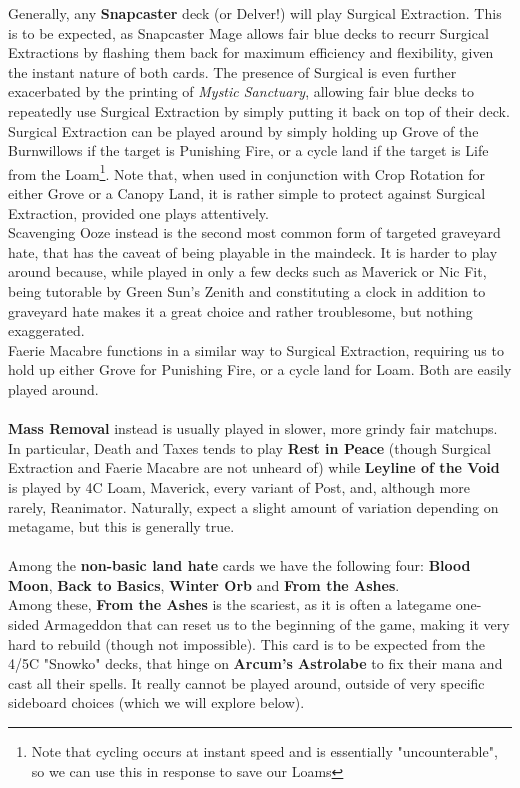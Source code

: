 \documentclass{report}
\begin{document}
Generally, any \textbf{Snapcaster} deck (or Delver!) will play Surgical Extraction. This is to be expected, as Snapcaster Mage allows fair blue decks to recurr Surgical Extractions by flashing them back for maximum efficiency and flexibility, given the instant nature of both cards. The presence of Surgical is even further exacerbated by the printing of \emph{Mystic Sanctuary}, allowing fair blue decks to repeatedly use Surgical Extraction by simply putting it back on top of their deck.\\
Surgical Extraction can be played around by simply holding up Grove of the Burnwillows if the target is Punishing Fire, or a cycle land if the target is Life from the Loam\footnote{Note that cycling occurs at instant speed and is essentially "uncounterable", so we can use this in response to save our Loams}. Note that, when used in conjunction with Crop Rotation for either Grove or a Canopy Land, it is rather simple to protect against Surgical Extraction, provided one plays attentively.\\
Scavenging Ooze instead is the second most common form of targeted graveyard hate, that has the caveat of being playable in the maindeck. It is harder to play around because, while played in only a few decks such as Maverick or Nic Fit, being tutorable by Green Sun's Zenith and constituting a clock in addition to graveyard hate makes it a great choice and rather troublesome, but nothing exaggerated.\\
Faerie Macabre functions in a similar way to Surgical Extraction, requiring us to hold up either Grove for Punishing Fire, or a cycle land for Loam. Both are easily played around.\\\\
\newpage
\textbf{Mass Removal} instead is usually played in slower, more grindy fair matchups. In particular, Death and Taxes tends to play \textbf{Rest in Peace} (though Surgical Extraction and Faerie Macabre are not unheard of) while \textbf{Leyline of the Void} is played by 4C Loam, Maverick, every variant of Post, and, although more rarely, Reanimator. Naturally, expect a slight amount of variation depending on metagame, but this is generally true.\\\\
Among the \textbf{non-basic land hate} cards we have the following four: \textbf{Blood Moon}, \textbf{Back to Basics}, \textbf{Winter Orb} and \textbf{From the Ashes}.\\
Among these, \textbf{From the Ashes} is the scariest, as it is often a lategame one-sided Armageddon that can reset us to the beginning of the game, making it very hard to rebuild (though not impossible). This card is to be expected from the 4/5C "Snowko" decks, that hinge on \textbf{Arcum's Astrolabe} to fix their mana and cast all their spells. It really cannot be played around, outside of very specific sideboard choices (which we will explore below).\\
\end{document}
